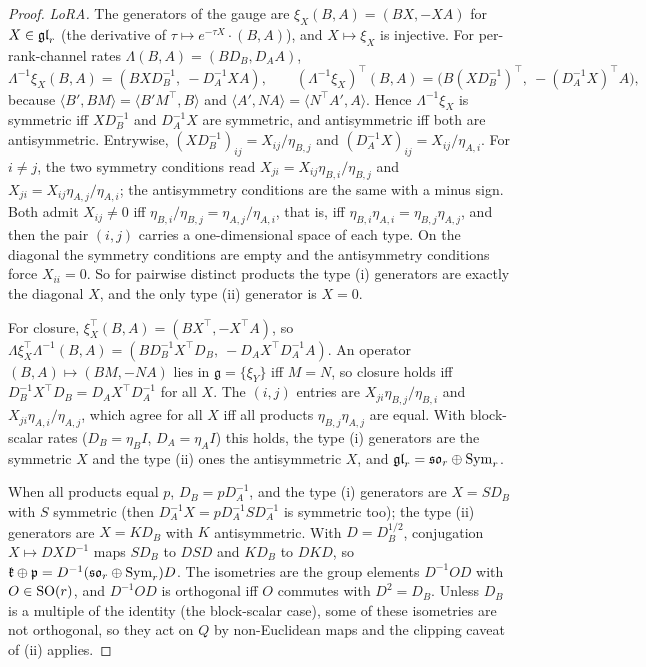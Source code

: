 \begin{proof}
\emph{LoRA.} The generators of the gauge are $\xi_X(B,A)=(BX,-XA)$ for $X\in\mathfrak{gl}_r$ (the derivative of $\tau\mapsto e^{-\tau X}\cdot(B,A)$),
and $X\mapsto\xi_X$ is injective. For per-rank-channel rates $\Lambda(B,A)=(BD_B,D_AA)$,
\[\Lambda^{-1}\xi_X(B,A)=(BXD_B^{-1},\ -D_A^{-1}XA),\qquad (\Lambda^{-1}\xi_X)^\top(B,A)=\big(B(XD_B^{-1})^\top,\ -(D_A^{-1}X)^\top A\big),\]
because $\langle B',BM\rangle=\langle B'M^\top,B\rangle$ and $\langle A',NA\rangle=\langle N^\top A',A\rangle$. Hence
$\Lambda^{-1}\xi_X$ is symmetric iff $XD_B^{-1}$ and $D_A^{-1}X$ are symmetric, and antisymmetric iff both are
antisymmetric. Entrywise, $(XD_B^{-1})_{ij}=X_{ij}/\eta_{B,j}$ and $(D_A^{-1}X)_{ij}=X_{ij}/\eta_{A,i}$. For $i\ne j$, the
two symmetry conditions read $X_{ji}=X_{ij}\eta_{B,i}/\eta_{B,j}$ and $X_{ji}=X_{ij}\eta_{A,j}/\eta_{A,i}$; the
antisymmetry conditions are the same with a minus sign. Both admit $X_{ij}\ne0$ iff
$\eta_{B,i}/\eta_{B,j}=\eta_{A,j}/\eta_{A,i}$, that is, iff $\eta_{B,i}\eta_{A,i}=\eta_{B,j}\eta_{A,j}$, and then the pair
$(i,j)$ carries a one-dimensional space of each type. On the diagonal the symmetry conditions are empty and the
antisymmetry conditions force $X_{ii}=0$. So for pairwise distinct products the type (i) generators are exactly the
diagonal $X$, and the only type (ii) generator is $X=0$.

For closure, $\xi_X^\top(B,A)=(BX^\top,-X^\top A)$, so $\Lambda\xi_X^\top\Lambda^{-1}(B,A)=(BD_B^{-1}X^\top D_B,\ -D_AX^\top D_A^{-1}A)$.
An operator $(B,A)\mapsto(BM,-NA)$ lies in $\mathfrak g=\{\xi_Y\}$ iff $M=N$, so closure holds iff
$D_B^{-1}X^\top D_B=D_AX^\top D_A^{-1}$ for all $X$. The $(i,j)$ entries are $X_{ji}\eta_{B,j}/\eta_{B,i}$ and
$X_{ji}\eta_{A,i}/\eta_{A,j}$, which agree for all $X$ iff all products $\eta_{B,j}\eta_{A,j}$ are equal. With block-scalar
rates ($D_B=\eta_BI$, $D_A=\eta_AI$) this holds, the type (i) generators are the symmetric $X$ and the type (ii) ones the
antisymmetric $X$, and $\mathfrak{gl}_r=\mathfrak{so}_r\oplus\mathrm{Sym}_r$.

When all products equal $p$, $D_B=pD_A^{-1}$, and the type (i) generators are $X=SD_B$ with $S$ symmetric (then
$D_A^{-1}X=pD_A^{-1}SD_A^{-1}$ is symmetric too); the type (ii) generators are $X=KD_B$ with $K$ antisymmetric. With
$D=D_B^{1/2}$, conjugation $X\mapsto DXD^{-1}$ maps $SD_B$ to $DSD$ and $KD_B$ to $DKD$, so
$\mathfrak k\oplus\mathfrak p=D^{-1}(\mathfrak{so}_r\oplus\mathrm{Sym}_r)D$. The isometries are the group elements $D^{-1}OD$ with
$O\in\mathrm{SO}(r)$, and $D^{-1}OD$ is orthogonal iff $O$ commutes with $D^2=D_B$. Unless $D_B$ is a multiple of the identity
(the block-scalar case), some of these isometries are not orthogonal, so they act on $Q$ by non-Euclidean maps and the
clipping caveat of (ii) applies.
\end{proof}

